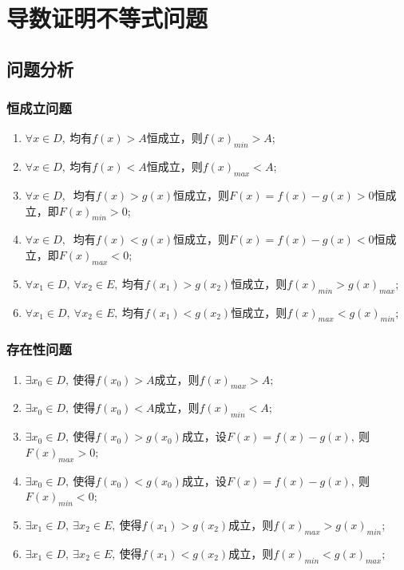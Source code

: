 
\section{导数证明不等式问题}

\renewcommand{\theexample}{\arabic{example}}
\newenvironment{example}[1][]{ \refstepcounter{example} \textbf{例\theexample:#1} \hspace{0.5em}}{\hspace{\stretch{1}} }

\subsection{问题分析}
\subsubsection{恒成立问题}
\begin{enumerate}[1)]
\item $ \forall x\in D, ~$均有$ f(x)>A $恒成立，则$ f(x)_{min}>A $;
\item $ \forall x\in D, ~$均有$ f(x)<A $恒成立，则$ f(x)_{max}<A $;
\item  $ \forall x\in D, ~$ 均有$ f(x)>g(x) $恒成立，则$ F(x)=f(x)-g(x) >0$恒成立，即$ F(x)_{min}>0 $;
\item  $ \forall x\in D, ~$ 均有$ f(x)<g(x) $恒成立，则$ F(x)=f(x)-g(x) <0$恒成立，即$ F(x)_{max}<0 $;
\item $\forall x_1\in D,~$$\forall x_2\in E,~$均有$ f(x_1)>g(x_2) $恒成立，则$ f(x)_{min}>g(x)_{max} $;
\item $\forall x_1\in D,~$$\forall x_2\in E,~$均有$ f(x_1)<g(x_2) $恒成立，则$ f(x)_{max}<g(x)_{min} $;
\end{enumerate}
\subsubsection{存在性问题}
\begin{enumerate}[1)]
\item $ \exists x_0\in D ,~$使得$ f(x_0) >A$成立，则$ f(x)_{max}>A; $ 
\item $ \exists x_0\in D ,~$使得$ f(x_0) <A$成立，则$ f(x)_{min}<A; $ 
\item $\exists x_0 \in D,~$使得$ f(x_0)>g(x_0) $成立，设$ F(x)=f(x)-g(x) ,~$则$ F(x)_{max}>0 $;
\item $\exists x_0 \in D,~$使得$ f(x_0)<g(x_0) $成立，设$ F(x)=f(x)-g(x) ,~$则$ F(x)_{min}<0 $;
\item $\exists x_1\in D,~$$\exists x_2\in E,~$使得$ f(x_1)>g(x_2) $成立，则$ f(x)_{max}>g(x)_{min} $;
\item $\exists x_1\in D,~$$\exists x_2\in E,~$使得$ f(x_1)<g(x_2) $成立，则$ f(x)_{min}<g(x)_{max} $;
\end{enumerate}
